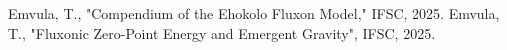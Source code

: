 \documentclass[11pt]{article}
\begin{document}

\begin{thebibliography}{9} %
     Emvula, T., "Compendium of the Ehokolo Fluxon Model," IFSC, 2025.
     Emvula, T., "Fluxonic Zero-Point Energy and Emergent Gravity", IFSC, 2025.
\end{thebibliography}
\end{document}
